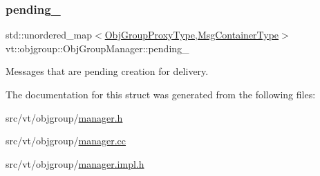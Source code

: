 \subsubsection{\texorpdfstring{pending\+\_\+}{pending\_}}
{\footnotesize\ttfamily std\+::unordered\+\_\+map$<$\hyperlink{namespacevt_ad7cae989df485fccca57f0792a880a8e}{Obj\+Group\+Proxy\+Type},\hyperlink{structvt_1_1objgroup_1_1_obj_group_manager_ab89e17bd301b2aa684fce22f0b4af30a}{Msg\+Container\+Type}$>$ vt\+::objgroup\+::\+Obj\+Group\+Manager\+::pending\+\_\+\hspace{0.3cm}{\ttfamily [private]}}



Messages that are pending creation for delivery. 



The documentation for this struct was generated from the following files\+:\begin{DoxyCompactItemize}
\item 
src/vt/objgroup/\hyperlink{objgroup_2manager_8h}{manager.\+h}\item 
src/vt/objgroup/\hyperlink{objgroup_2manager_8cc}{manager.\+cc}\item 
src/vt/objgroup/\hyperlink{objgroup_2manager_8impl_8h}{manager.\+impl.\+h}\end{DoxyCompactItemize}
